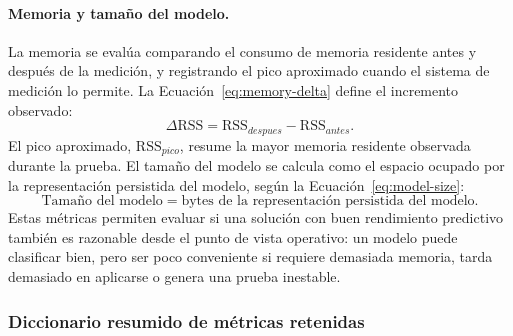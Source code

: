\documentclass[12pt,oneside]{report}
\begin{document}
\paragraph{Memoria y tamaño del modelo.}
La memoria se evalúa comparando el consumo de memoria residente antes y después de la medición, y registrando el pico aproximado cuando el sistema de medición lo permite. La Ecuación~\eqref{eq:memory-delta} define el incremento observado:
\begin{equation}
\label{eq:memory-delta}
\Delta \mathrm{RSS}=\mathrm{RSS}_{despues}-\mathrm{RSS}_{antes}.
\end{equation}
El pico aproximado, $\mathrm{RSS}_{pico}$, resume la mayor memoria residente observada durante la prueba. El tamaño del modelo se calcula como el espacio ocupado por la representación persistida del modelo, según la Ecuación~\eqref{eq:model-size}:
\begin{equation}
\label{eq:model-size}
\text{Tamaño del modelo}=\text{bytes de la representación persistida del modelo}.
\end{equation}
Estas métricas permiten evaluar si una solución con buen rendimiento predictivo también es razonable desde el punto de vista operativo: un modelo puede clasificar bien, pero ser poco conveniente si requiere demasiada memoria, tarda demasiado en aplicarse o genera una prueba inestable.

\subsubsection{Diccionario resumido de métricas retenidas}
\end{document}
